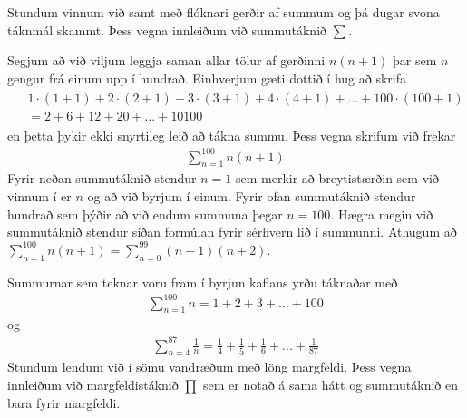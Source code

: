 \documentclass[a4paper,10pt,icelandic]{sphinxmanual}
\begin{document}
Stundum vinnum við samt með flóknari gerðir af summum og þá dugar svona táknmál skammt. Þess vegna innleiðum við summutáknið \(\sum\).

Segjum að við viljum leggja saman allar tölur af gerðinni \(n(n+1)\) þar sem \(n\) gengur frá einum upp í hundrað. Einhverjum gæti dottið í hug að skrifa
\begin{equation*}
\begin{split}\begin{aligned}
& 1 \cdot (1+1)+2 \cdot (2+1)+3 \cdot (3+1)+4 \cdot (4+1)+...+100 \cdot (100+1)\\ &=2+6+12+20+...+10100 \end{aligned}\end{split}
\end{equation*}
en þetta þykir ekki snyrtileg leið að tákna summu. Þess vegna skrifum við frekar
\begin{equation*}
\begin{split}\sum_{n=1}^{100}n(n+1)\end{split}
\end{equation*}
Fyrir neðan summutáknið stendur \(n=1\) sem merkir að breytistærðin sem við vinnum í er \(n\) og að við byrjum í einum. Fyrir ofan summutáknið stendur hundrað sem þýðir að við endum summuna þegar \(n=100\). Hægra megin við summutáknið stendur síðan formúlan fyrir sérhvern lið í summunni. Athugum að \(\sum_{n=1}^{100}n(n+1) = \sum_{n=0}^{99}(n+1)(n+2)\).

Summurnar sem teknar voru fram í byrjun kaflans yrðu táknaðar með
\begin{equation*}
\begin{split}\sum_{n=1}^{100}n=1+2+3+...+100\end{split}
\end{equation*}
og
\begin{equation*}
\begin{split}\sum_{n=4}^{87}\frac{1}{n} = \frac{1}{4}+\frac{1}{5}+\frac{1}{6}+...+\frac{1}{87}\end{split}
\end{equation*}
Stundum lendum við í sömu vandræðum með löng margfeldi. Þess vegna innleiðum við margfeldistáknið \(\prod\) sem er notað á sama hátt og summutáknið en bara fyrir margfeldi.
\end{document}
